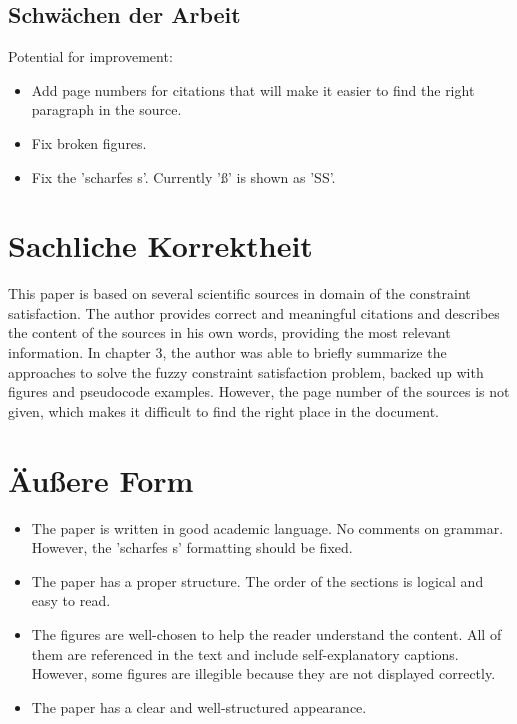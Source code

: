 \documentclass[a4paper,DIV=16]{scrartcl}
\begin{document}
\subsection*{Schwächen der Arbeit}

Potential for improvement:
\begin{itemize}
\item Add page numbers for citations that will make it easier to find the right paragraph in the source.
\item Fix broken figures.
\item Fix the 'scharfes s'. Currently 'ß' is shown as 'SS'.
\end{itemize}  


\section*{Sachliche Korrektheit}

This paper is based on several scientific sources in domain of the constraint satisfaction. The author provides correct and meaningful citations and describes the content of the sources in his own words, providing the most relevant information. In chapter 3, the author was able to briefly summarize the approaches to solve the fuzzy constraint satisfaction problem, backed up with figures and pseudocode examples. However, the page number of the sources is not given, which makes it difficult to find the right place in the document.


\section*{Äußere Form}

\begin{itemize}
\item The paper is written in good academic language. No comments on grammar. However, the 'scharfes s' formatting should be fixed.
\item The paper has a proper structure. The order of the sections is logical and easy to read.
\item The figures are well-chosen to help the reader understand the content. All of them are referenced in the text and include self-explanatory captions. However, some figures are illegible because they are not displayed correctly.
\item The paper has a clear and well-structured appearance.

\end{itemize}  
\end{document}
